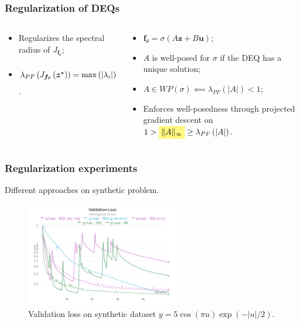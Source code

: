 \documentclass[t]{beamer}
\newcommand{\highlight}[1]{%
  \colorbox{yellow!50}{$\displaystyle#1$}}
\begin{document}
\begin{frame}
    \frametitle{Regularization of DEQs}

    \begin{columns}
	\begin{column}{0.5\textwidth}
	    \cite{bai_stabilizing_2021}
	    \begin{itemize}[label={\textbullet}]
		\item Regularizes the spectral radius of $J_{\bm{f}_{\theta}}$;
		\item $\lambda_{PF}\left( J_{\bm{f}_{\theta}}\left( \bm{z}^{\star} \right)  \right) = \max\left( |\lambda_i| \right) \le \sqrt{tr\left( J_{\bm{f}_{\theta}}J_{\bm{f}_{\theta}}^T \right) } = \highlight{\|J_{\bm{f}_{\theta}}\|_{F}} $.
	    \end{itemize}
	\end{column}

        \begin{column}{0.5\textwidth}
	    \cite{Ghaoui2019}
	    \begin{itemize}[label={\textbullet}]
		\item $\bm{f}_{\theta} = \sigma\left( A\bm{z} + B\bm{u} \right)$;
	        \item $A$ is well-posed for $\sigma$ if the DEQ has a unique solution;
		\item $A\in WP\left( \sigma \right) \impliedby \lambda_{PF}\left( |A| \right) < 1  $;
		\item Enforces well-posedness through projected gradient descent on $1 > \highlight{\|A\|_{\infty}} \ge \lambda_{PF}\left( |A| \right)$.
	    \end{itemize}
        \end{column}
    \end{columns}
\end{frame}

\begin{frame}
    \frametitle{Regularization experiments}
    Different approaches on synthetic problem.

    \begin{figure}[h]
        \centering
        \includegraphics[width=0.6\textwidth]{dummy-val.png}
        \caption{Validation loss on synthetic dataset $y=5\cos\left( \pi u \right)\exp(-|u|/2)$.}
        \label{fig:dummy-val-png}
    \end{figure}
\end{frame}
\end{document}
